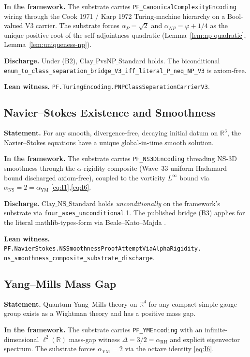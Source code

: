 \documentclass[11pt,a4paper]{article}
\theoremstyle{plain}
\theoremstyle{definition}
\theoremstyle{remark}
\newcommand{\alphaP}{\alpha_{P}}
\newcommand{\alphaNP}{\alpha_{NP}}
\newcommand{\alphaRH}{\alpha_{\mathrm{RH}}}
\newcommand{\alphaYM}{\alpha_{\mathrm{YM}}}
\newcommand{\alphaNS}{\alpha_{\mathrm{NS}}}
\newcommand{\Cstd}[1]{\mathrm{Clay\_#1\_Standard}}
\newcommand{\code}[1]{\texttt{#1}}
\begin{document}
\textbf{In the framework.} The substrate carries
\code{PF\_CanonicalComplexityEncoding} wiring through the Cook
1971 \cite{cook1971} / Karp 1972 \cite{karp1972}
Turing-machine hierarchy on a Bool-valued V3 carrier. The
substrate forces $\alphaP = \sqrt{2}$ and $\alphaNP = \varphi +
1/4$ as the unique positive root of the self-adjointness
quadratic (Lemma~\ref{lem:np-quadratic},
Lemma~\ref{lem:uniqueness-np}).

\textbf{Discharge.} Under (B2), $\Cstd{PvsNP}$ holds. The
biconditional
\code{enum\_to\_class\_separation\_bridge\_V3\_iff\_literal\_P\_neq\_NP\_V3}
is axiom-free.

\textbf{Lean witness.}
\code{PF.TuringEncoding.PNPClassSeparationCarrierV3}.

\subsection{Navier--Stokes Existence and Smoothness}
\label{sec:ns}

\textbf{Statement.} For any smooth, divergence-free, decaying
initial datum on $\mathbb{R}^{3}$, the Navier--Stokes equations
have a unique global-in-time smooth solution.

\textbf{In the framework.} The substrate carries
\code{PF\_NS3DEncoding} threading NS-3D smoothness through the
$\alpha$-rigidity composite (Wave~33 uniform Hadamard bound
discharged axiom-free), coupled to the vorticity $L^{\infty}$
bound via $\alphaNS = 2 = \alphaYM$ \eqref{eq:I1},\eqref{eq:I6}.

\textbf{Discharge.} $\Cstd{NS}$ holds \emph{unconditionally}
on the framework's substrate via
\code{four\_axes\_unconditional}.1. The published bridge (B3)
applies for the literal mathlib-types-form via Beale--Kato--Majda
\cite{beale1984}.

\textbf{Lean witness.}
\code{PF.NavierStokes.NSSmoothnessProofAttemptViaAlphaRigidity.\\ns\_smoothness\_composite\_substrate\_discharge}.

\subsection{Yang--Mills Mass Gap}
\label{sec:ym}

\textbf{Statement.} Quantum Yang--Mills theory on $\mathbb{R}^{4}$
for any compact simple gauge group exists as a Wightman theory
and has a positive mass gap.

\textbf{In the framework.} The substrate carries
\code{PF\_YMEncoding} with an infinite-dimensional
$\ell^{2}(\mathbb{R})$ mass-gap witness $\Delta = 3/2 =
\alphaRH$ and explicit eigenvector spectrum. The substrate
forces $\alphaYM = 2$ via the octave identity \eqref{eq:I6}.
\end{document}
